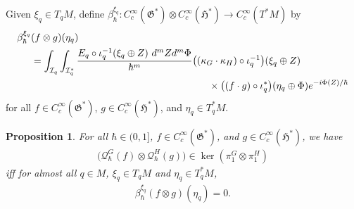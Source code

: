 \documentclass[sn-mathphys,Numbered]{sn-jnl}
\newtheorem{proposition}[theorem]{Proposition}%
\begin{document}
Given $\xi_q\in T_qM$, define $\beta_\hbar^{\xi_q}: C_c^\infty(\mathfrak{G}^*)\otimes C_c^\infty(\mathfrak{H}^*)\to C_c^\infty(T^*M)$ by
\begin{align}
    \beta_\hbar^{\xi_q}&(f\otimes g)(\eta_q)\\
    &= \int_{\mathcal{I}_q}\int_{\mathcal{I}_q^*} \frac{E_q\circ \iota_q^{-1}(\xi_q\oplus Z)\ d^{m}Z d^{m}\Phi}{\hbar^m} \big((\kappa_G\cdot\kappa_H)\circ\iota_q^{-1}\big)(\xi_q\oplus Z)\\
    & \hspace{2.5in} \times \big((f\cdot g)\circ\iota_q^*\big)(\eta_q\oplus \Phi)e^{-i\Phi(Z)/\hbar}
\end{align}
for all $f\in C_c^\infty(\mathfrak{G}^*)$, $g\in C_c^\infty(\mathfrak{H}^*)$, and $\eta_q\in T^*_qM$.\bigskip


\begin{proposition}
\label{prop:bimodule_limit}
    For all $\hbar\in (0,1]$, $f\in C_c^\infty(\mathfrak{G}^*)$, and $g\in C_c^\infty(\mathfrak{H}^*)$, we have
    \begin{align}
    \big(\mathcal{Q}_\hbar^G(f)\otimes \mathcal{Q}_\hbar^H(g)\big)\in \ker(\pi_1^G\otimes \pi_1^H)
    \end{align}
    iff for almost all $q\in M$, $\xi_q\in T_qM$ and $\eta_q\in T_q^*M$,
\begin{align}
    \beta_\hbar^{\xi_q}(f\otimes g)(\eta_q) = 0.
\end{align}
\end{proposition}\bigskip
\end{document}
